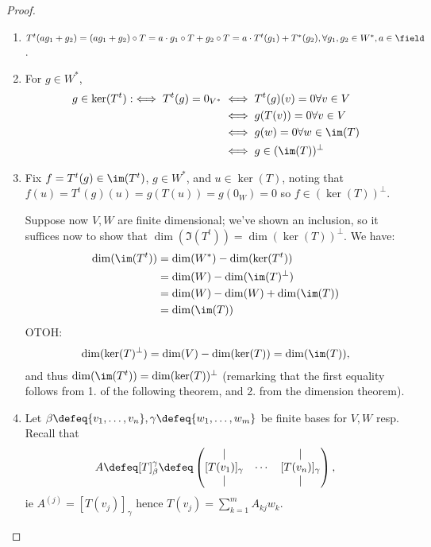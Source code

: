 \begin{proof}
    \begin{enumerate}
        \item $T^t(ag_1 + g_2) = (ag_1 + g_2)\circ T = a \cdot g_1 \circ T + g_2 \circ T = a \cdot T^{t}(g_1) + T^\ast(g_2), \forall g_1, g_2 \in W^\ast, a \in \field$.
        \item For $g \in W^\ast$, \begin{align*}
            g \in \ker(T^t) :\iff T^t(g) = 0_{V^\ast} &\iff T^t(g)(v) = 0 \forall v \in V\\
            &\iff g(T(v)) = 0 \forall v \in V\\
            &\iff g(w) = 0 \forall w \in \im(T)\\
            &\iff g \in (\im(T))^\perp
        \end{align*}
        \item Fix $f = T^t(g) \in \im(T^t)$, $g \in W^\ast$, and $u \in \ker(T)$, noting that $f(u) = T^t(g)(u) = g(T(u)) = g(0_W) = 0$ so $f \in (\ker(T))^\perp$.
        
        Suppose now $V, W$ are finite dimensional; we've shown an inclusion, so it suffices now to show that $\dim(\Im(T^t)) = \dim(\ker(T))^\perp$. We have:
        \begin{align*}
            \dim(\im(T^t)) &= \dim(W^\ast) - \dim(\ker(T^t)) \\
            &= \dim(W) - \dim(\im(T)^\perp) \\
            &= \dim(W) - \dim(W) + \dim(\im(T))\\ 
            &= \dim(\im(T))
        \end{align*}
        OTOH:
        \begin{align*}
            \dim(\ker(T)^\perp) = \dim(V) - \dim(\ker(T)) = \dim(\im(T)),
        \end{align*}
        and thus $\dim(\im(T^t)) = \dim(\ker(T))^\perp$ (remarking that the first equality follows from 1. of the following theorem, and 2. from the dimension theorem).

        \item Let $\beta \defeq\{v_1, \dots, v_n\}, \gamma \defeq \{w_1, \dots, w_m\}$ be finite bases for $V, W$ resp. Recall that $$A \defeq [T]_\beta^\gamma \defeq \begin{pmatrix}
            \vert & & \vert\\
            [T(v_1)]_\gamma & \cdots & [T(v_n)]_\gamma\\
            \vert & & \vert
        \end{pmatrix},$$
        ie $A^{(j)} = [T(v_j)]_\gamma$ hence $T(v_j) = \sum_{k=1}^m A_{kj} w_k$.


\end{enumerate}
\end{proof}
